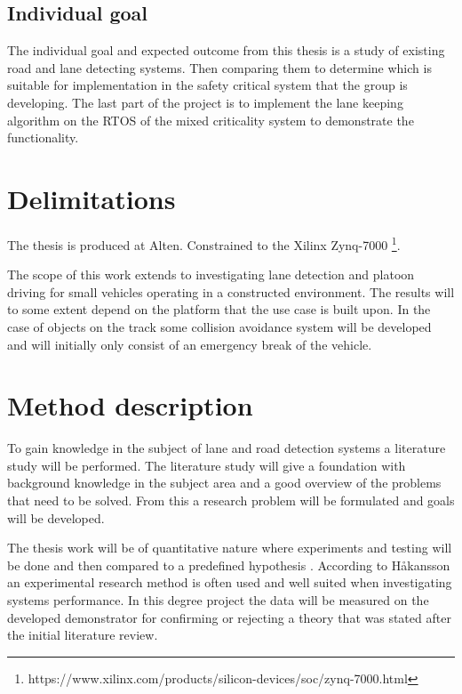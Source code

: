 \subsection{Individual goal}
The individual goal and expected outcome from this thesis is a study of existing road and lane detecting systems. Then comparing them to determine which is suitable for implementation in the safety critical system that the group is developing. The last part of the project is to implement the lane keeping algorithm on the RTOS of the mixed criticality system to demonstrate the functionality.

\section{Delimitations}
The thesis is produced at Alten.
Constrained to the Xilinx Zynq-7000 \footnote{https://www.xilinx.com/products/silicon-devices/soc/zynq-7000.html}.

The scope of this work extends to investigating lane detection and platoon driving for small vehicles operating in a constructed environment. The results will to some extent depend on the platform that the use case is built upon. In the case of objects on the track some collision avoidance system will be developed and will initially only consist of an emergency break of the vehicle.

\section{Method description}
To gain knowledge in the subject of lane and road detection systems a literature study will be performed. The literature study will give a foundation with background knowledge in the subject area and a good overview of the problems that need to be solved. From this a research problem will be formulated and goals will be developed. 

The thesis work will be of quantitative nature where experiments and testing will be done and then compared to a predefined hypothesis \cite{haakansson2013portal}. According to Håkansson \cite{haakansson2013portal} an experimental research method is often used and well suited when investigating systems performance. In this degree project the data will be measured on the developed demonstrator for confirming or rejecting a theory that was stated after the initial literature review.